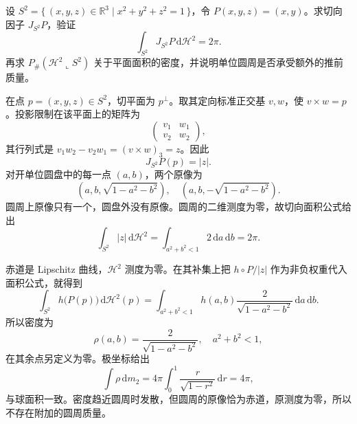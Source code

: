 \begin{exercise}\label{b1:ex:19-sphere-projection-density}
设 \(S^2=\{\,(x,y,z)\in\mathbb R^3\mid x^2+y^2+z^2=1\,\}\)，令 \(P(x,y,z)=(x,y)\)。求切向因子 \(J_{S^2}P\)，验证
\[
 \int_{S^2}J_{S^2}P\,\mathrm d\mathcal H^2=2\pi.
\]
再求 \(P_\#(\mathcal H^2\llcorner S^2)\) 关于平面面积的密度，并说明单位圆周是否承受额外的推前质量。
\end{exercise}
\begin{solution}
在点 \(p=(x,y,z)\in S^2\)，切平面为 \(p^\perp\)。取其定向标准正交基 \(v,w\)，使 \(v\times w=p\)。投影限制在该平面上的矩阵为
\[
 \begin{pmatrix}v_1&w_1\\v_2&w_2\end{pmatrix},
\]
其行列式是 \(v_1w_2-v_2w_1=(v\times w)_3=z\)。因此
\[
 J_{S^2}P(p)=|z|.
\]
对开单位圆盘中的每一点 \((a,b)\)，两个原像为
\[
 \left(a,b,\sqrt{1-a^2-b^2}\right),
 \quad \left(a,b,-\sqrt{1-a^2-b^2}\right).
\]
圆周上原像只有一个，圆盘外没有原像。圆周的二维测度为零，故切向面积公式给出
\[
 \int_{S^2}|z|\,\mathrm d\mathcal H^2
 =\int_{a^2+b^2<1}2\,\mathrm da\,\mathrm db=2\pi.
\]

赤道是 Lipschitz 曲线，\(\mathcal H^2\) 测度为零。在其补集上把 \(h\circ P/|z|\) 作为非负权重代入面积公式，就得到
\[
 \int_{S^2}h\bigl(P(p)\bigr)\,\mathrm d\mathcal H^2(p)
 =\int_{a^2+b^2<1}
 h(a,b)\frac{2}{\sqrt{1-a^2-b^2}}\,\mathrm da\,\mathrm db.
\]
所以密度为
\[
 \rho(a,b)=\frac{2}{\sqrt{1-a^2-b^2}},
 \quad a^2+b^2<1,
\]
在其余点另定义为零。极坐标给出
\[
 \int\rho\,\mathrm dm_2
 =4\pi\int_0^1\frac r{\sqrt{1-r^2}}\,\mathrm dr=4\pi,
\]
与球面积一致。密度趋近圆周时发散，但圆周的原像恰为赤道，原测度为零，所以不存在附加的圆周质量。
\end{solution}

